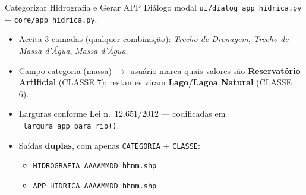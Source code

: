 \documentclass[10pt,aspectratio=169]{beamer}
\begin{document}
\begin{frame}{Categorizar Hidrografia e Gerar APP}
  Diálogo modal \texttt{ui/dialog\_app\_hidrica.py} + \texttt{core/app\_hidrica.py}.
  \begin{itemize}
    \item Aceita 3 camadas (qualquer combinação): \emph{Trecho de Drenagem}, \emph{Trecho de Massa d'Água}, \emph{Massa d'Água}.
    \item Campo categoria (massa) $\rightarrow$ usuário marca quais valores são \textbf{Reservatório Artificial} (CLASSE 7); restantes viram \textbf{Lago/Lagoa Natural} (CLASSE 6).
    \item Larguras conforme Lei n.\ 12.651/2012 — codificadas em \texttt{\_largura\_app\_para\_rio()}.
    \item Saídas \textbf{duplas}, com apenas \texttt{CATEGORIA} + \texttt{CLASSE}:
      \begin{itemize}
        \item \texttt{HIDROGRAFIA\_AAAAMMDD\_hhmm.shp}
        \item \texttt{APP\_HIDRICA\_AAAAMMDD\_hhmm.shp}
      \end{itemize}
  \end{itemize}
\end{frame}
\end{document}
